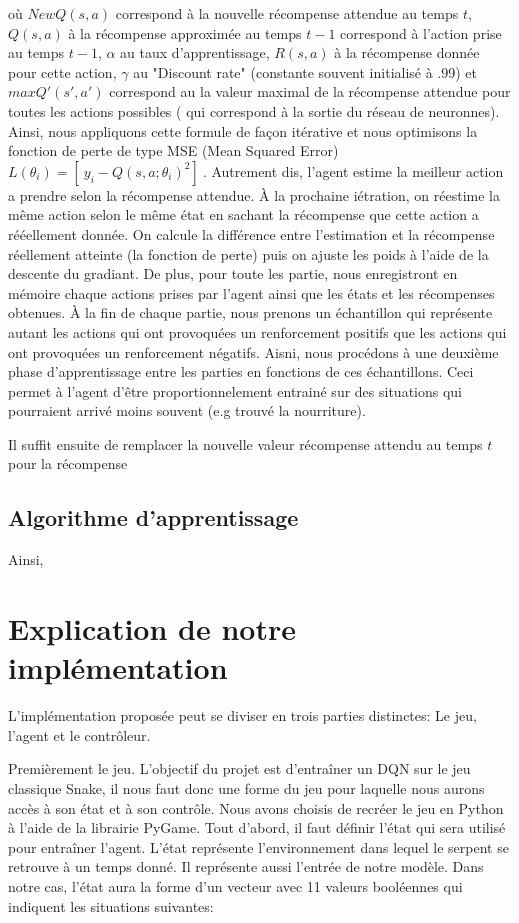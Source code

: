 \documentclass{article}
\begin{document}
où $NewQ(s,a) $ correspond à la nouvelle récompense attendue au temps $t$, $Q(s,a)$ à la récompense approximée au temps $t-1$ correspond à l'action prise au temps $t-1$, $\alpha$ au taux d'apprentissage, $R(s,a)$ à la récompense donnée pour cette action, $\gamma$ au "Discount rate" (constante souvent initialisé à .99) et $maxQ{'} (s{'},a{'})$ correspond au la valeur maximal de la récompense attendue pour toutes les actions possibles ( qui correspond à la sortie du réseau de neuronnes). Ainsi, nous appliquons cette formule de façon itérative et nous optimisons la fonction de perte de type MSE (Mean Squared Error)  $L( \theta_{i}) = [\ y_{i} - Q(s,a; \theta_{i})^{2} ]\ $. Autrement dis, l'agent estime la meilleur action a prendre selon la récompense attendue. À la prochaine iétration, on réestime la même action selon le même état en sachant la récompense que cette action a rééellement donnée. On calcule la différence entre l'estimation et la récompense réellement atteinte (la fonction de perte) puis on ajuste les poids à l'aide de la descente du gradiant. De plus, pour toute les partie, nous enregistront en mémoire chaque actions prises par l'agent ainsi que les états et les récompenses obtenues. À la fin de chaque partie, nous prenons un échantillon qui représente autant les actions qui ont provoquées un renforcement positifs que les actions qui ont provoquées un renforcement négatifs. Aisni, nous procédons à une deuxième phase d'apprentissage entre les parties en fonctions de ces échantillons. Ceci permet à l'agent d'être proportionnelement entrainé sur des situations qui pourraient arrivé moins souvent (e.g trouvé la nourriture). 

Il suffit ensuite de remplacer la nouvelle valeur récompense attendu au temps $t$ pour la récompense

\subsection{Algorithme d'apprentissage}



Ainsi, 
\section{Explication de notre implémentation}

L’implémentation proposée peut se diviser en trois parties distinctes: Le jeu, l’agent et le contrôleur.

Premièrement le jeu. L’objectif du projet est d’entraîner un DQN sur le jeu classique Snake, il nous faut donc une forme du jeu pour laquelle nous aurons accès à son état et à son contrôle. Nous avons choisis de recréer le jeu en Python à l’aide de la librairie PyGame. Tout d'abord, il faut définir l’état qui sera utilisé pour entraîner l’agent. L’état représente l’environnement dans lequel le serpent se retrouve à un temps donné. Il représente aussi l’entrée de notre modèle. Dans notre cas, l’état aura la forme d’un vecteur avec 11 valeurs booléennes qui indiquent les situations suivantes:
\end{document}
